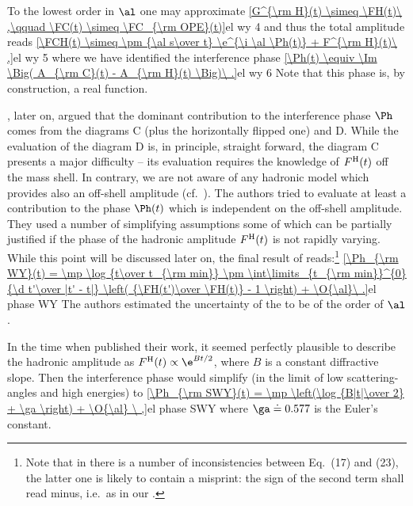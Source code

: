 To the lowest order in $\al$ one may approximate
\eqref{G^{\rm H}(t) \simeq \FH(t)\ ,\qquad \FC(t) \simeq \FC_{\rm OPE}(t)}{el wy 4}
and thus the total amplitude reads
\eqref{\FCH(t) \simeq \pm {\al s\over t} \e^{\i \al \Ph(t)} + F^{\rm H}(t)\ ,}{el wy 5}
where we have identified the interference phase
\eqref{\Ph(t) \equiv \Im \Big( A_{\rm C}(t) - A_{\rm H}(t) \Big)\ .}{el wy 6}
Note that this phase is, by construction, a real function.


\WY, later on, argued that the dominant contribution to the interference phase $\Ph$ comes from the diagrams  C (plus the horizontally flipped one) and D. While the evaluation of the diagram D is, in principle, straight forward, the diagram C presents a major difficulty -- its evaluation requires the knowledge of $F^{\rm H}(t)$ off the mass shell. In contrary, we are not aware of any hadronic model which provides also an off-shell amplitude (cf.~). The authors tried to evaluate at least a contribution to the phase $\Ph(t)$ which is independent on the off-shell amplitude. They used a number of simplifying assumptions some of which can be partially justified if the phase of the hadronic amplitude $F^{\rm H}(t)$ is not rapidly varying. While this point will be discussed later on, the final result of \WY{} reads:\footnote{%
Note that in  there is a number of inconsistencies between Eq.~(17) and (23), the latter one is likely to contain a misprint: the sign of the second term shall read minus, i.e.~as in our .
}
\eqref{\Ph_{\rm WY}(t) = \mp \log {t\over t_{\rm min}} \pm \int\limits_{t_{\rm min}}^{0} {\d t'\over |t' - t|} \left( {\FH(t')\over \FH(t)} - 1 \right) + \O{\al}\ .}{el phase WY}
The authors estimated the uncertainty of the \rhs{} to be of the order of $\al$.

In the time when \WY{} published their work, it seemed perfectly plausible to describe the hadronic amplitude as $\FH(t) \propto \e^{Bt/2}$, where $B$ is a constant diffractive slope. Then the interference phase would simplify (in the limit of low scattering-angles and high energies) to
\eqref{\Ph_{\rm SWY}(t) = \mp \left(\log {B|t|\over 2} + \ga \right) + \O{\al} \ ,}{el phase SWY}
where $\ga \doteq 0.577$ is the Euler's constant.

